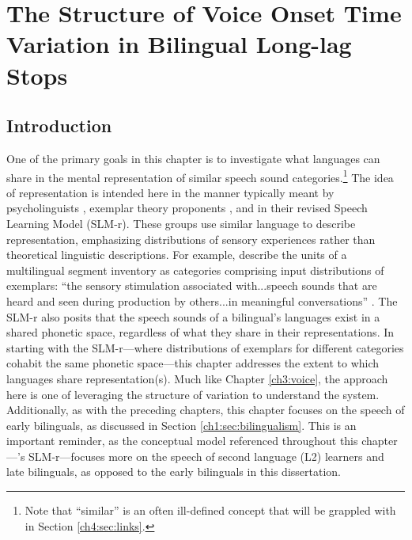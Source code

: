 \setcounter{chapter}{3}
\chapter{The Structure of Voice Onset Time Variation in Bilingual Long-lag Stops}\label{ch4:uniformity}

\section{Introduction}\label{ch4:sec:intro}

One of the primary goals in this chapter is to investigate what languages can share in the mental representation of similar speech sound categories.\footnote{Note that ``similar'' is an often ill-defined concept that will be grappled with in Section \ref{ch4:sec:links}.} The idea of representation is intended here in the manner typically meant by psycholinguists \citep[e.g.,][]{llompart_2018_acoustic}, exemplar theory proponents \citep[e.g.,][]{amengual_2018_laterals}, and \citet{flege_2021_slmr} in their revised Speech Learning Model (SLM-r). These groups use similar language to describe representation, emphasizing distributions of sensory experiences rather than theoretical linguistic descriptions. For example, \citeauthor{flege_2021_slmr} describe the units of a multilingual segment inventory as categories comprising input distributions of exemplars: ``the sensory stimulation associated with...speech sounds that are heard and seen during production by others...in meaningful conversations'' \citeyearpar[][p. 32]{flege_2021_slmr}. The SLM-r also posits that the speech sounds of a bilingual's languages exist in a shared phonetic space, regardless of what they share in their representations. In starting with the SLM-r---where distributions of exemplars for different categories cohabit the same phonetic space---this chapter addresses the extent to which languages share representation(s). Much like Chapter \ref{ch3:voice}, the approach here is one of leveraging the structure of variation to understand the system. Additionally, as with the preceding chapters, this chapter focuses on the speech of early bilinguals, as discussed in Section \ref{ch1:sec:bilingualism}. This is an important reminder, as the conceptual model referenced throughout this chapter---\citeauthor{flege_2021_slmr}'s \citeyearpar{flege_2021_slmr} SLM-r---focuses more on the speech of second language (L2) learners and late bilinguals, as opposed to the early bilinguals in this dissertation. 

